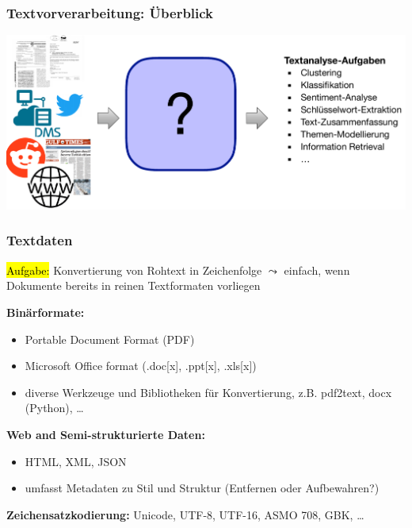 
\begin{frame}[c]
    \frametitle{Textvorverarbeitung: Überblick}

\centering\includegraphics[width=\textwidth]{fig8/text-overview.pdf}

\end{frame}


\begin{frame}[shrink=10]
    \frametitle{Textdaten}

    \hl{Aufgabe:} Konvertierung von Rohtext in Zeichenfolge
    $\leadsto$ einfach, wenn Dokumente bereits in reinen Textformaten vorliegen

    \textbf{Binärformate:}
    \begin{itemize}
    \item Portable Document Format (PDF)
    \item Microsoft Office format (.doc[x], .ppt[x], .xls[x])
    \item diverse Werkzeuge und Bibliotheken für Konvertierung, z.B. pdf2text, docx (Python), \dots 
    \end{itemize}
    \textbf{Web and Semi-strukturierte Daten:}
    \begin{itemize}
    \item HTML, XML, JSON
    \item umfasst Metadaten zu Stil und Struktur (Entfernen oder Aufbewahren?)
     \end{itemize}
    \textbf{Zeichensatzkodierung:} Unicode, UTF-8, UTF-16, ASMO 708, GBK, \dots
    
\end{frame}



